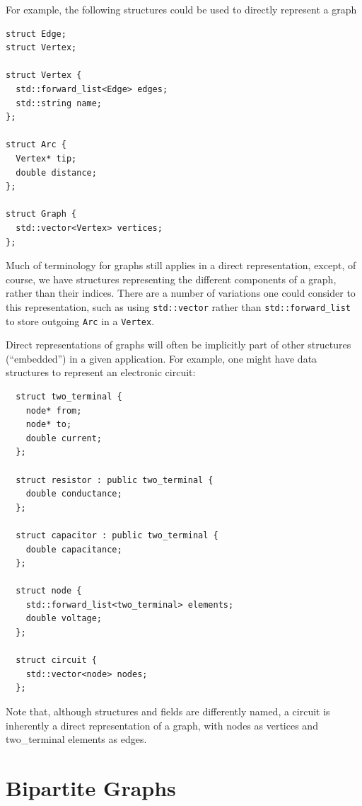 For example, the following structures could be used to directly represent a graph 
\begin{lstlisting}
struct Edge;
struct Vertex;

struct Vertex {
  std::forward_list<Edge> edges;
  std::string name;
};

struct Arc {
  Vertex* tip;
  double distance;
};

struct Graph {
  std::vector<Vertex> vertices;
};
\end{lstlisting}  

Much of terminology for graphs still applies in a direct representation, except, of course, we have structures representing the different components of a graph, rather than their indices.  There are a number of variations one could consider to this representation, such as using \lstinline{std::vector} rather than \lstinline{std::forward_list} to store outgoing \lstinline{Arc} in a \lstinline{Vertex}.

Direct representations of graphs will often be implicitly part of other structures (``embedded'') in a given application.
For example,
one might have data structures to represent an electronic circuit:
\begin{lstlisting}
  struct two_terminal {
    node* from;
    node* to;
    double current;
  };

  struct resistor : public two_terminal {
    double conductance;
  };

  struct capacitor : public two_terminal {
    double capacitance;
  };

  struct node {
    std::forward_list<two_terminal> elements;
    double voltage;
  };

  struct circuit {
    std::vector<node> nodes;
  };
\end{lstlisting}
Note that, although structures and fields are differently named, a circuit is inherently a direct representation of a graph, with nodes as vertices and two\_terminal elements as edges.



\section{Bipartite Graphs}
\label{sec:bipartite}

